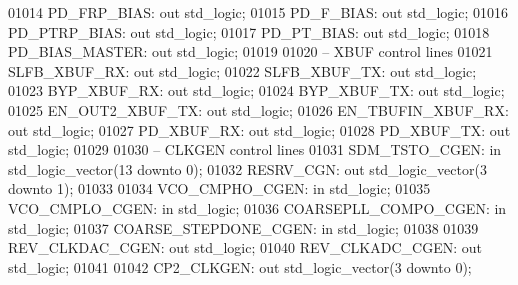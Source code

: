 \begin{DoxyCode}
01014         PD\_FRP\_BIAS:    \textcolor{keywordflow}{out} \textcolor{comment}{std\_logic};
01015         PD\_F\_BIAS:  \textcolor{keywordflow}{out} \textcolor{comment}{std\_logic};
01016         PD\_PTRP\_BIAS:   \textcolor{keywordflow}{out} \textcolor{comment}{std\_logic};
01017         PD\_PT\_BIAS: \textcolor{keywordflow}{out} \textcolor{comment}{std\_logic};
01018         PD\_BIAS\_MASTER: \textcolor{keywordflow}{out} \textcolor{comment}{std\_logic};
01019         
01020 \textcolor{keyword}{        -- XBUF control lines}
01021         SLFB\_XBUF\_RX:   \textcolor{keywordflow}{out} \textcolor{comment}{std\_logic};
01022         SLFB\_XBUF\_TX:   \textcolor{keywordflow}{out} \textcolor{comment}{std\_logic};
01023         BYP\_XBUF\_RX:    \textcolor{keywordflow}{out} \textcolor{comment}{std\_logic};
01024         BYP\_XBUF\_TX:    \textcolor{keywordflow}{out} \textcolor{comment}{std\_logic};
01025         EN\_OUT2\_XBUF\_TX:    \textcolor{keywordflow}{out} \textcolor{comment}{std\_logic};
01026         EN\_TBUFIN\_XBUF\_RX:  \textcolor{keywordflow}{out} \textcolor{comment}{std\_logic};
01027         PD\_XBUF\_RX:     \textcolor{keywordflow}{out} \textcolor{comment}{std\_logic};
01028         PD\_XBUF\_TX:     \textcolor{keywordflow}{out} \textcolor{comment}{std\_logic};
01029 
01030 \textcolor{keyword}{        -- CLKGEN control lines }
01031         SDM\_TSTO\_CGEN:      \textcolor{keywordflow}{in} \textcolor{comment}{std\_logic\_vector}(\textcolor{vhdllogic}{}\textcolor{vhdllogic}{13} \textcolor{keywordflow}{downto} \textcolor{vhdllogic}{}\textcolor{vhdllogic}{0});       
01032         RESRV\_CGN:          \textcolor{keywordflow}{out} \textcolor{comment}{std\_logic\_vector}(\textcolor{vhdllogic}{}\textcolor{vhdllogic}{3} \textcolor{keywordflow}{downto} \textcolor{vhdllogic}{}\textcolor{vhdllogic}{1});
01033         
01034         VCO\_CMPHO\_CGEN:     \textcolor{keywordflow}{in} \textcolor{comment}{std\_logic};
01035         VCO\_CMPLO\_CGEN:     \textcolor{keywordflow}{in} \textcolor{comment}{std\_logic};
01036         COARSEPLL\_COMPO\_CGEN:   \textcolor{keywordflow}{in} \textcolor{comment}{std\_logic};
01037         COARSE\_STEPDONE\_CGEN:   \textcolor{keywordflow}{in} \textcolor{comment}{std\_logic};
01038         
01039         REV\_CLKDAC\_CGEN:    \textcolor{keywordflow}{out} \textcolor{comment}{std\_logic};
01040         REV\_CLKADC\_CGEN:    \textcolor{keywordflow}{out} \textcolor{comment}{std\_logic};
01041 
01042         CP2\_CLKGEN:     \textcolor{keywordflow}{out} \textcolor{comment}{std\_logic\_vector}(\textcolor{vhdllogic}{}\textcolor{vhdllogic}{3} \textcolor{keywordflow}{downto} \textcolor{vhdllogic}{}\textcolor{vhdllogic}{0});

\end{DoxyCode}
